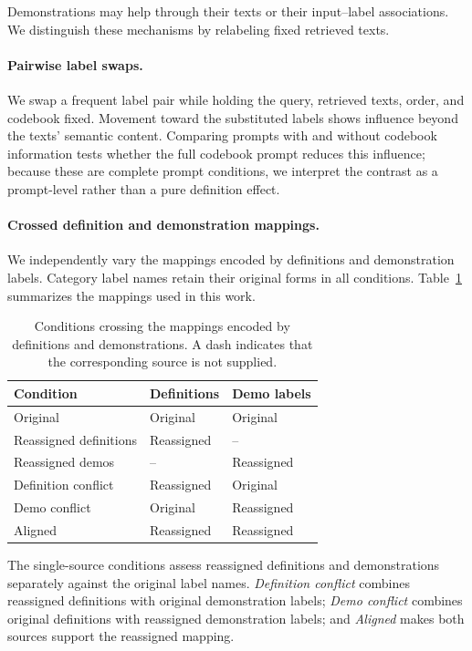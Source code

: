 \documentclass[11pt]{article}
\begin{document}
Demonstrations may help through their texts or their input--label associations. We distinguish these mechanisms by relabeling fixed retrieved texts.

\paragraph{Pairwise label swaps.}
We swap a frequent label pair while holding the query, retrieved texts, order, and codebook fixed. Movement toward the substituted labels shows influence beyond the texts' semantic content. Comparing prompts with and without codebook information tests whether the full codebook prompt reduces this influence; because these are complete prompt conditions, we interpret the contrast as a prompt-level rather than a pure definition effect.

\paragraph{Crossed definition and demonstration mappings.}
We independently vary the mappings encoded by definitions and demonstration labels. Category label names retain their original forms in all conditions. Table~\ref{tab:counterfactual-design} summarizes the mappings used in this work. 

\begin{table}[t]
\centering
\small
\setlength{\tabcolsep}{4pt}
\begin{tabular}{lll}
\toprule
\textbf{Condition} & \textbf{Definitions} & \textbf{Demo labels} \\
\midrule
Original               & Original   & Original \\
Reassigned definitions & Reassigned & -- \\
Reassigned demos       & --         & Reassigned \\
Definition conflict    & Reassigned & Original \\
Demo conflict          & Original   & Reassigned \\
Aligned                & Reassigned & Reassigned \\
\bottomrule
\end{tabular}
\caption{Conditions crossing the mappings encoded by definitions and demonstrations. A dash indicates that the corresponding source is not supplied.}
\label{tab:counterfactual-design}
\end{table}

The single-source conditions assess reassigned definitions and demonstrations separately against the original label names. \emph{Definition conflict} combines reassigned definitions with original demonstration labels; \emph{Demo conflict} combines original definitions with reassigned demonstration labels; and \emph{Aligned} makes both sources support the reassigned mapping.
\end{document}
